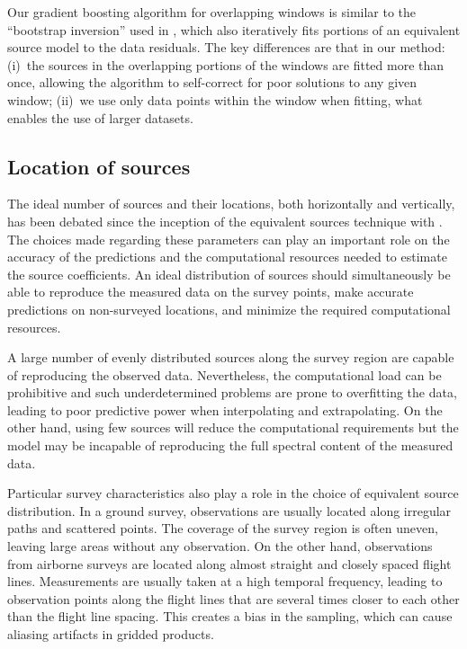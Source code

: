Our gradient boosting algorithm for overlapping windows is similar to the
``bootstrap inversion'' used in \citet{vonfrese1988}, which also iteratively
fits portions of an equivalent source model to the data residuals.
The key differences are that in our method:
(i)~the sources in the overlapping portions of the windows are fitted more than
once, allowing the algorithm to self-correct for poor solutions to any given
window;
(ii)~we use only data points within the window when fitting, what enables the
use of larger datasets.


\subsection{Location of sources}
\label{sec:source_distribution}

The ideal number of sources and their locations, both horizontally and
vertically, has been debated since the inception of the equivalent sources
technique with \citet{dampney1969}.
The choices made regarding these parameters can play an important role on the
accuracy of the predictions and the computational resources needed to estimate
the source coefficients.
An ideal distribution of sources should simultaneously be able to reproduce the
measured data on the survey points, make accurate predictions on non-surveyed
locations, and minimize the required computational resources.

A large number of evenly distributed sources along the survey region are
capable of reproducing the observed data.
Nevertheless, the computational load can be prohibitive and such
underdetermined problems are prone to overfitting the data, leading to poor
predictive power when interpolating and extrapolating.
On the other hand, using few sources will reduce the computational requirements
but the model may be incapable of reproducing the full spectral content of the
measured data.

Particular survey characteristics also play a role in the choice of equivalent
source distribution.
In a ground survey, observations are usually located along irregular paths and
scattered points.
The coverage of the survey region is often uneven, leaving large areas without
any observation.
On the other hand, observations from airborne surveys are located along almost
straight and closely spaced flight lines.
Measurements are usually taken at a high temporal frequency, leading to
observation points along the flight lines that are several times closer to each
other than the flight line spacing.
This creates a bias in the sampling, which can cause aliasing artifacts in
gridded products.

